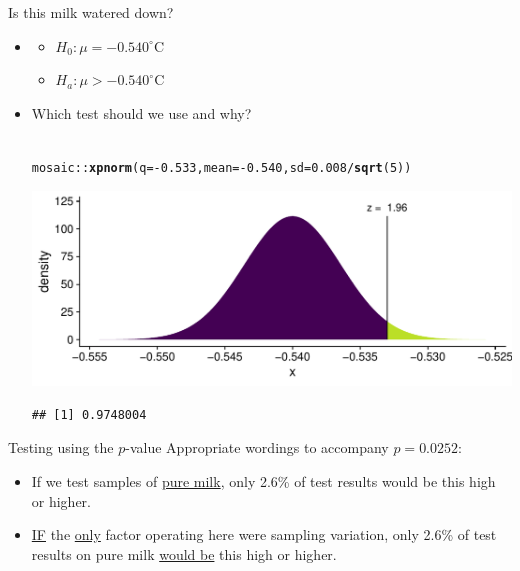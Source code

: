\documentclass[10pt,handout]{beamer}\usepackage[]{graphicx}\usepackage[]{color}
\makeatletter
\def\maxwidth{ %
  \ifdim\Gin@nat@width>\linewidth
    \linewidth
  \else
    \Gin@nat@width
  \fi
}
\newcommand{\hlnum}[1]{\textcolor[rgb]{0.686,0.059,0.569}{#1}}%
\newcommand{\hlopt}[1]{\textcolor[rgb]{0,0,0}{#1}}%
\newcommand{\hlstd}[1]{\textcolor[rgb]{0.345,0.345,0.345}{#1}}%
\newcommand{\hlkwc}[1]{\textcolor[rgb]{0.333,0.667,0.333}{#1}}%
\newcommand{\hlkwd}[1]{\textcolor[rgb]{0.737,0.353,0.396}{\textbf{#1}}}%
\newenvironment{kframe}{%
 \def\at@end@of@kframe{}%
 \ifinner\ifhmode%
  \def\at@end@of@kframe{\end{minipage}}%
  \begin{minipage}{\columnwidth}%
 \fi\fi%
 \def\FrameCommand##1{\hskip\@totalleftmargin \hskip-\fboxsep
 \colorbox{shadecolor}{##1}\hskip-\fboxsep
     \hskip-\linewidth \hskip-\@totalleftmargin \hskip\columnwidth}%
 \MakeFramed {\advance\hsize-\width
   \@totalleftmargin\z@ \linewidth\hsize
   \@setminipage}}%
 {\par\unskip\endMakeFramed%
 \at@end@of@kframe}
\newenvironment{knitrout}{}{} %
\makeatother
\begin{document}
\begin{frame}[fragile]{Is this milk watered down?}
	\begin{itemize}
		\setlength\itemsep{.7em}
		\item {} \pause \begin{itemize}
			\item $H_0: \mu =  -0.540^{\circ}$C \pause
			\item  $H_a: \mu >  -0.540^{\circ}$C
		\end{itemize}
		\item Which test should we use and why? \pause \\ \ \\
		
		
\begin{knitrout}\tiny
{}\color{fgcolor}\begin{kframe}
\begin{alltt}
\hlstd{mosaic}\hlopt{::}\hlkwd{xpnorm}\hlstd{(}\hlkwc{q} \hlstd{=} \hlopt{-}\hlnum{0.533}\hlstd{,} \hlkwc{mean} \hlstd{=} \hlopt{-}\hlnum{0.540}\hlstd{,} \hlkwc{sd} \hlstd{=} \hlnum{0.008}\hlopt{/}\hlkwd{sqrt}\hlstd{(}\hlnum{5}\hlstd{))}
\end{alltt}
\end{kframe}

{\centering \includegraphics[width=\maxwidth]{figure/unnamed-chunk-2-1} 

}


\begin{kframe}\begin{verbatim}
## [1] 0.9748004
\end{verbatim}
\end{kframe}
\end{knitrout}
		
	\end{itemize}
\end{frame}

\begin{frame}[fragile]{Testing using the $p$-value}
	Appropriate wordings to accompany $p=0.0252$:
	\begin{itemize}
		\setlength\itemsep{1.5em}
		\item If we test samples of \underline{pure milk}, only 2.6\% of test results would be this high or higher.
		\pause 
		\item \underline{IF} the \underline{only} factor operating here were sampling variation, only  2.6\% of test results on pure milk  \underline{would be} this high or higher.
	\end{itemize}
	
\end{frame}
\end{document}
